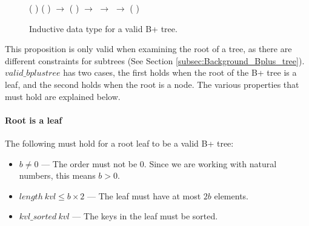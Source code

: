 \begin{figure}
\begin{coqdoccode}
 (  ) (  )  \ensuremath{\rightarrow}\coqdoceol
\coqdocindent{11.00em}
 (  )   \ensuremath{\rightarrow}\coqdoceol
\coqdocindent{11.00em}
  \ensuremath{\rightarrow}  \coqdoceol
\coqdocindent{11.00em}
    \ensuremath{\rightarrow}\coqdoceol
\coqdocindent{11.00em}
   (   )   \coqdoceol
\end{coqdoccode}
\caption{Inductive data type for a valid B+ tree.}
\label{fig:inductive_valid_bplustree}
\end{figure}

This proposition is only valid when examining the root of a tree, as there are different constraints for subtrees (See Section \ref{subsec:Background_Bplus_tree}). $valid\_bplustree$ has two cases, the first holds when the root of the B+ tree is a leaf, and the second holds when the root is a node. The various properties that must hold are explained below.

\paragraph{Root is a leaf}
The following must hold for a root leaf to be a valid B+ tree:
\label{valid_root_is_a_leaf}
\begin{itemize}
\item $b \neq 0$ --- The order must not be 0. Since we are working with natural numbers, this means $b > 0$.
\item $length\ kvl \leq b \times 2 $ --- The leaf must have at most $2b$ elements.
\item $kvl\_sorted\ kvl$ --- The keys in the leaf must be sorted.
\end{itemize}

